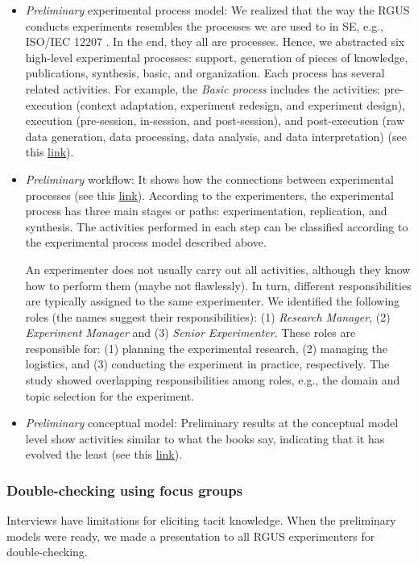 \begin{itemize}
	\item \textit{Preliminary} experimental process model: We realized that the way the RGUS conducts experiments resembles the processes we are used to in SE, e.g., ISO/IEC 12207 \cite{ISO-IEC-IEEE-12207}. In the end, they all are processes. Hence, we abstracted six high-level experimental processes: support, generation of pieces of knowledge, publications, synthesis, basic, and organization. Each process has several related activities. For example, the \textit{Basic process} includes the activities: pre-execution (context adaptation, experiment redesign, and experiment design), execution (pre-session, in-session, and post-session), and post-execution (raw data generation, data processing, data analysis, and data interpretation) (see this \href{https://zenodo.org/record/7102301#.Yyt0GOzMLUI}{\ul{link}}).
	
\item \textit{Preliminary} workflow: It shows how the connections between experimental processes (see this \href{https://zenodo.org/record/7102360#.Yyt1a-zMLUI}{\ul{link}}). According to the experimenters, the experimental process has three main stages or paths: experimentation, replication, and synthesis. The activities performed in each step can be classified according to the experimental process model described above.

An experimenter does not usually carry out all activities, although they know how to perform them (maybe not flawlessly). In turn, different responsibilities are typically assigned to the same experimenter. We identified the following roles (the names suggest their responsibilities): (1) \textit{Research Manager}, (2) \textit{Experiment Manager} and (3) \textit{Senior Experimenter}. These roles are responsible for: (1) planning the experimental research, (2) managing the logistics, and (3) conducting the experiment in practice, respectively. The study showed overlapping responsibilities among roles, e.g., the domain and topic selection for the experiment.

	\item \textit{Preliminary} conceptual model: Preliminary results at the conceptual model level show activities similar to what the books say, indicating that it has evolved the least (see this \href{https://zenodo.org/record/7102387#.Yyt7W-zMLUI}{\ul{link}}).
\end{itemize}

\subsubsection{Double-checking using focus groups}\label{subsubsec-focus-groups}
Interviews have limitations for eliciting tacit knowledge. When the preliminary models were ready, we made a presentation to all RGUS experimenters for double-checking. 

